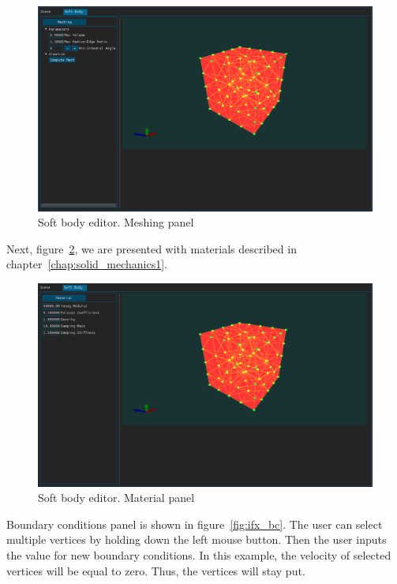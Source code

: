 \documentclass[en]{minipw} %
\begin{document}
\begin{figure}[h!]
\centering
\includegraphics[scale=0.3]{pictures/ifx/ifx_meshing.png}
\caption[Soft body editor. Meshing panel]{Soft body editor. Meshing panel}
\label{fig:ifx_meshing}
\end{figure}

Next, figure~\ref{fig:ifx_material}, we are presented with materials described in chapter~\ref{chap:solid_mechanics1}.

\begin{figure}[h!]
\centering
\includegraphics[scale=0.3]{pictures/ifx/ifx_material.png}
\caption[Soft body editor. Material panel]{Soft body editor. Material panel}
\label{fig:ifx_material}
\end{figure}

Boundary conditions panel is shown in figure~\ref{fig:ifx_bc}. The user can select multiple vertices by holding down the left mouse button. Then the user inputs the value for new boundary conditions. In this example, the velocity of selected vertices will be equal to zero. Thus, the vertices will stay put.
\end{document}
